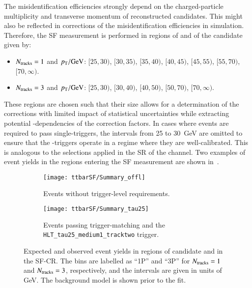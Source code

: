 The \jettotauhadvis misidentification efficiencies strongly depend on the
charged-particle multiplicity and transverse momentum of reconstructed
\tauhadvis candidates. This might also be reflected in corrections of the
\jettotauhadvis misidentification efficiencies in simulation. Therefore, the SF
measurement is performed in regions of \Ntracks and \pT of the \tauhadvis
candidate given by:
\begin{itemize}

\item $\Ntracks = 1$ and $\pT / \si{\GeV}$: $[25, 30)$, $[30, 35)$, $[35, 40)$,
  $[40, 45)$, $[45, 55)$, $[55, 70)$, $[70, \infty)$.

\item $\Ntracks = 3$ and $\pT / \si{\GeV}$: $[25, 30)$, $[30, 40)$, $[40, 50)$,
  $[50, 70)$, $[70, \infty)$.

\end{itemize}
These regions are chosen such that their size allows for a determination of the
corrections with limited impact of statistical uncertainties while extracting
potential \pT-dependencies of the correction factors. In cases where events are
required to pass single-\tauhadvis triggers, the \pT intervals from 25 to
\SI{30}{\GeV} are omitted to ensure that the \tauhadvis-triggers operate in a
regime where they are well-calibrated. This is analogous to the selections
applied in the SR of the \hadhad channel. Two examples of event yields in the
regions entering the SF measurement are shown
in~.

\begin{figure}[htbp]
  \centering

  \begin{subfigure}[t]{.48\textwidth}
    \texttt{[image: ttbarSF/Summary\_offl]}

    \caption{Events without trigger-level \tauid requirements.}
  \end{subfigure}\hfill%
  \begin{subfigure}[t]{.48\textwidth}
    \texttt{[image: ttbarSF/Summary\_tau25]}

    \caption{Events passing \tauhadvis trigger-matching and the
      \texttt{HLT\_tau25\_medium1\_tracktwo} trigger.}
  \end{subfigure}

  \caption[Expected and observed event yields in regions of \tauhadvis candidate
  \Ntracks and \pT in the SF-CR.]{Expected and observed event yields in regions
    of \tauhadvis candidate \Ntracks and \pT in the SF-CR. The bins are labelled
    as ``1P'' and ``3P'' for $\Ntracks = 1$ and $\Ntracks = 3$, respectively,
    and the \pT intervals are given in units of \si{\GeV}. The background model
    is shown prior to the fit.}%
  \label{fig:ttbarsf_region_summary_prefit}
\end{figure}

